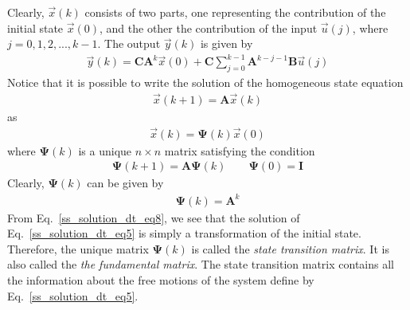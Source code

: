 \documentclass[11pt,a4paper,oneside]{book}
\numberwithin{equation}{section}
\theoremstyle{it}
\theoremstyle{definition}
\begin{document}
Clearly, $\vec{x}(k)$ consists of two parts, one representing the contribution 
of the initial state $\vec{x}(0)$, and the other the contribution of the input 
$\vec{u}(j)$, where $j = 0,1,2,...,k-1$. The output $\vec{y}(k)$ is given by
\begin{equation}\label{ss_solution_dt_eq4}
	\begin{aligned}
		\vec{y}(k) = \mathbf{C}\mathbf{A}^k\vec{x}(0) + 
		\mathbf{C}\sum_{j=0}^{k-1}\mathbf{A}^{k-j-1}\mathbf{B}\vec{u}(j)
	\end{aligned}
\end{equation}
Notice that it is possible to write the solution of the homogeneous state 
equation
\begin{equation}\label{ss_solution_dt_eq5}
	\begin{aligned}
		\vec{x}(k+1) = \mathbf{A}\vec{x}(k)
	\end{aligned}
\end{equation}
as 
\begin{equation}\label{ss_solution_dt_eq6}
	\begin{aligned}
		\vec{x}(k) = \mathbf{\Psi}(k)\vec{x}(0)
	\end{aligned}
\end{equation}
where $\mathbf{\Psi}(k)$ is a unique $n \times n$ matrix satisfying the 
condition
\begin{equation}\label{ss_solution_dt_eq7}
	\begin{aligned}
		\mathbf{\Psi}(k+1) = \mathbf{A}\mathbf{\Psi}(k) \quad \quad 
		\mathbf{\Psi}(0)=\mathbf{I}
	\end{aligned}
\end{equation}
Clearly, $\mathbf{\Psi}(k)$ can be given by 
\begin{equation}\label{ss_solution_dt_eq8}
	\begin{aligned}
		\mathbf{\Psi}(k) = \mathbf{A}^k
	\end{aligned}
\end{equation}
From Eq.~\eqref{ss_solution_dt_eq8}, we see that the solution of 
Eq.~\eqref{ss_solution_dt_eq5} is simply a 
transformation of the initial state. Therefore, the unique matrix 
$\mathbf{\Psi}(k)$ is called the \textit{state transition matrix}. It is also 
called the \textit{the fundamental matrix}. The state transition matrix 
contains all the information about the free motions of the system define by 
Eq.~\eqref{ss_solution_dt_eq5}.
\end{document}
